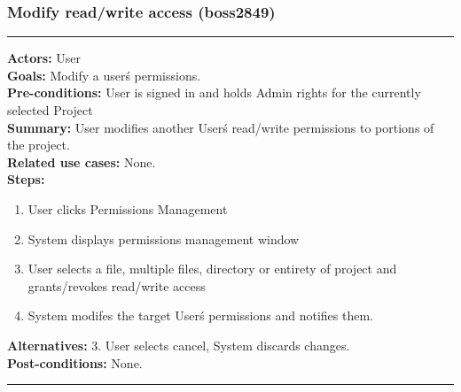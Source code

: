 \documentclass[11pt]{report}
\begin{document}
\subsubsection{Modify read/write access (boss2849)}
\vspace{2pt}
\hrule
\vspace{8pt}
 \textbf{Actors:} User \\ 
 \textbf{Goals:} Modify a user\'s permissions. \\
 \textbf{Pre-conditions:} User is signed in and holds Admin rights for the currently selected Project\\
 \textbf{Summary:} User modifies another User\'s read/write permissions to portions of the project. \\
 \textbf{Related use cases:} None. \\ 
 \textbf{Steps:} \begin{enumerate}
  \item User clicks Permissions Management
  \item System displays permissions management window
  \item User selects a file, multiple files, directory or entirety of project and grants/revokes read/write access
  \item System modifes the target User\'s permissions and notifies them.
 \end{enumerate}
 \textbf{Alternatives:} 3. User selects cancel, System discards changes. \\
 \textbf{Post-conditions:} None. \\
 \vspace{8pt}
\hrule
\newpage
\end{document}
